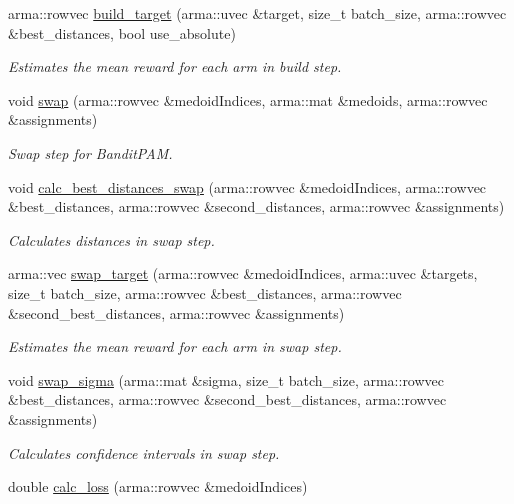\begin{DoxyCompactItemize}
arma\+::rowvec \hyperlink{classKMedoids_ab9734e538771e3a25b48c1a2a1b9f65c}{build\+\_\+target} (arma\+::uvec \&target, size\+\_\+t batch\+\_\+size, arma\+::rowvec \&best\+\_\+distances, bool use\+\_\+absolute)
\begin{DoxyCompactList}\small\item\em Estimates the mean reward for each arm in build step. \end{DoxyCompactList}\item 
void \hyperlink{classKMedoids_a4f4e9ff2de791f4bb506ae9af6cad554}{swap} (arma\+::rowvec \&medoid\+Indices, arma\+::mat \&medoids, arma\+::rowvec \&assignments)
\begin{DoxyCompactList}\small\item\em Swap step for Bandit\+P\+AM. \end{DoxyCompactList}\item 
void \hyperlink{classKMedoids_a03f94093b27d9a60c9d2b0c5218f7466}{calc\+\_\+best\+\_\+distances\+\_\+swap} (arma\+::rowvec \&medoid\+Indices, arma\+::rowvec \&best\+\_\+distances, arma\+::rowvec \&second\+\_\+distances, arma\+::rowvec \&assignments)
\begin{DoxyCompactList}\small\item\em Calculates distances in swap step. \end{DoxyCompactList}\item 
arma\+::vec \hyperlink{classKMedoids_a19e19a8c7a2f4a759f4172540f455f4e}{swap\+\_\+target} (arma\+::rowvec \&medoid\+Indices, arma\+::uvec \&targets, size\+\_\+t batch\+\_\+size, arma\+::rowvec \&best\+\_\+distances, arma\+::rowvec \&second\+\_\+best\+\_\+distances, arma\+::rowvec \&assignments)
\begin{DoxyCompactList}\small\item\em Estimates the mean reward for each arm in swap step. \end{DoxyCompactList}\item 
void \hyperlink{classKMedoids_adfed8aabd3801d7f29901a5e5cdff558}{swap\+\_\+sigma} (arma\+::mat \&sigma, size\+\_\+t batch\+\_\+size, arma\+::rowvec \&best\+\_\+distances, arma\+::rowvec \&second\+\_\+best\+\_\+distances, arma\+::rowvec \&assignments)
\begin{DoxyCompactList}\small\item\em Calculates confidence intervals in swap step. \end{DoxyCompactList}\item 
double \hyperlink{classKMedoids_a6402fe3e77eeefeb47559a1e6d7dbe8a}{calc\+\_\+loss} (arma\+::rowvec \&medoid\+Indices)

\end{DoxyCompactItemize}
